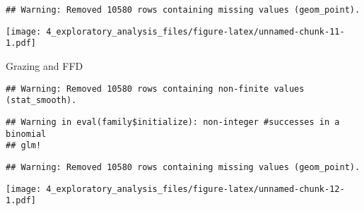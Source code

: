 \documentclass[]{article}
\begin{document}
\begin{verbatim}
## Warning: Removed 10580 rows containing missing values (geom_point).
\end{verbatim}

\texttt{[image: 4\_exploratory\_analysis\_files/figure-latex/unnamed-chunk-11-1.pdf]}

Grazing and FFD

\begin{verbatim}
## Warning: Removed 10580 rows containing non-finite values (stat_smooth).
\end{verbatim}

\begin{verbatim}
## Warning in eval(family$initialize): non-integer #successes in a binomial
## glm!
\end{verbatim}

\begin{verbatim}
## Warning: Removed 10580 rows containing missing values (geom_point).
\end{verbatim}

\texttt{[image: 4\_exploratory\_analysis\_files/figure-latex/unnamed-chunk-12-1.pdf]}
\end{document}
